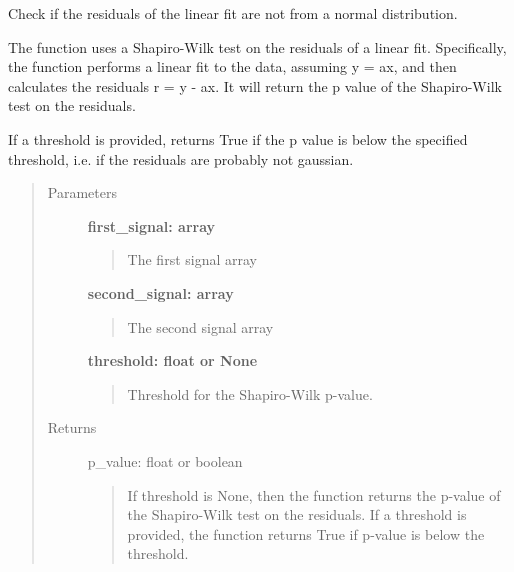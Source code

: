 \documentclass[letterpaper,10pt,english]{sphinxmanual}
\begin{document}
\begin{fulllineitems}
\label{fit_checks:fit_checks.check_residuals_not_gaussian}
Check if the residuals of the linear fit are not from a normal distribution.

The function uses a Shapiro-Wilk test on the residuals of a linear fit. Specifically,
the function performs a linear fit to the data, assuming y = ax, and then calculates the residuals
r = y - ax. It will return the p value of the Shapiro-Wilk test on the residuals.

If a threshold is provided, returns True if the p value is below the specified threshold, i.e. if
the residuals are probably not gaussian.
\begin{quote}\begin{description}
\item[{Parameters}] \leavevmode
\textbf{first\_signal: array}
\begin{quote}

The first signal array
\end{quote}

\textbf{second\_signal: array}
\begin{quote}

The second signal array
\end{quote}

\textbf{threshold: float or None}
\begin{quote}

Threshold for the Shapiro-Wilk p-value.
\end{quote}

\item[{Returns}] \leavevmode
p\_value: float or boolean
\begin{quote}

If threshold is None, then the function returns the p-value of the Shapiro-Wilk test on the residuals.
If a threshold is provided, the function returns True if p-value is below the threshold.
\end{quote}

\end{description}\end{quote}

\end{fulllineitems}

\end{document}
